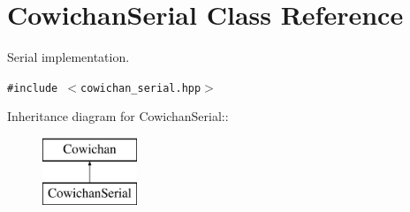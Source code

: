 \hypertarget{class_cowichan_serial}{
\section{CowichanSerial Class Reference}
\label{class_cowichan_serial}
}
Serial implementation.  


{\tt \#include $<$cowichan\_\-serial.hpp$>$}

Inheritance diagram for CowichanSerial::\begin{figure}[H]
\begin{center}
\leavevmode
\includegraphics[height=2cm]{class_cowichan_serial}
\end{center}
\end{figure}
